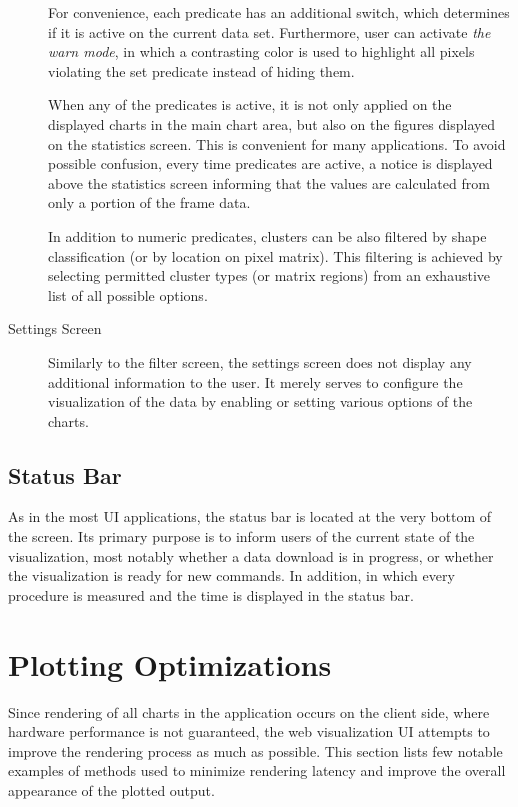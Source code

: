 \begin{description}
	For convenience, each predicate has an additional switch, which determines if it is active on the current data set. Furthermore, user can activate \textit{the warn mode}, in which a contrasting color is used to highlight all pixels violating the set predicate instead of hiding them.

	When any of the predicates is active, it is not only applied on the displayed charts in the main chart area, but also on the figures displayed on the statistics screen. This is convenient for many applications. To avoid possible confusion, every time predicates are active, a notice is displayed above the statistics screen informing that the values are calculated from only a portion of the frame data.

	In addition to numeric predicates, clusters can be also filtered by shape classification (or by location on pixel matrix). This filtering is achieved by selecting permitted cluster types (or matrix regions) from an exhaustive list of all possible options.

	\item[Settings Screen]
	Similarly to the filter screen, the settings screen does not display any additional information to the user. It merely serves to configure the visualization of the data by enabling or setting various options of the charts.
\end{description}

\subsection{Status Bar}
As in the most UI applications, the status bar is located at the very bottom of the screen. Its primary purpose is to inform users of the current state of the visualization, most notably whether a data download is in progress, or whether the visualization is ready for new commands. In addition, in which every procedure is measured and the time is displayed in the status bar.

\section{Plotting Optimizations}
Since rendering of all charts in the application occurs on the client side, where hardware performance is not guaranteed, the web visualization UI attempts to improve the rendering process as much as possible. This section lists few notable examples of methods used to minimize rendering latency and improve the overall appearance of the plotted output.

